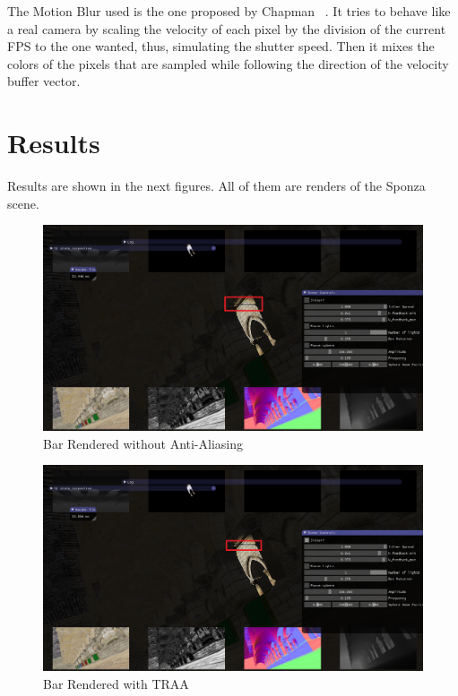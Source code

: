 \documentclass{acmsiggraph}               %
\begin{document}
The Motion Blur used is the one proposed by Chapman ~\cite{Chapman2012}. It tries to behave like a real camera by scaling the velocity of each pixel by the division of the current FPS to the one wanted, thus, simulating the shutter speed. Then it mixes the colors of the pixels that are sampled while following the direction of the velocity buffer vector.

\section{Results}
Results are shown in the next figures. All of them are renders of the Sponza scene.

\begin{figure}[H]
    \centering
    \includegraphics[width=0.9\columnwidth]{NO_AA.png}
    \caption{Bar Rendered without Anti-Aliasing}
    \label{fig_NO_AA}
\end{figure}

\begin{figure}[H]
    \centering
    \includegraphics[width=0.9\columnwidth]{TRAA.png}
    \caption{Bar Rendered with TRAA}
    \label{fig_TRAA}
\end{figure}
\end{document}
